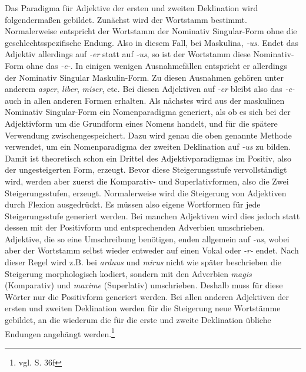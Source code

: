 Das Paradigma für Adjektive der ersten und zweiten Deklination wird folgendermaßen gebildet. Zunächst wird der Wortstamm bestimmt. Normalerweise entspricht der Wortstamm der Nominativ Singular-Form ohne die geschlechtsspezifische Endung. Also in diesem Fall, bei Maskulina, \textit{-us}. Endet das Adjektiv allerdings auf \textit{-er} statt auf \textit{-us}, so ist der Wortstamm diese Nominativ-Form ohne das \textit{-e-}. In einigen wenigen Ausnahmefällen entspricht er allerdings der Nominativ Singular Maskulin-Form. Zu diesen Ausnahmen gehören unter anderem \textit{asper}, \textit{liber}, \textit{miser}, etc. Bei diesen Adjektiven auf \textit{-er} bleibt also das \textit{-e-} auch in allen anderen Formen erhalten. Als nächstes wird aus der maskulinen Nominativ Singular-Form ein Nomenparadigma generiert, als ob es sich bei der Adjektivform um die Grundform eines Nomens handelt, und für die spätere Verwendung zwischengespeichert. Dazu wird genau die oben genannte Methode verwendet, um ein Nomenparadigma der zweiten Deklination auf \textit{-us} zu bilden. Damit ist theoretisch schon ein Drittel des Adjektivparadigmas im Positiv, also der ungesteigerten Form, erzeugt. Bevor diese Steigerungsstufe vervollständigt wird, werden aber zuerst die Komparativ- und Superlativformen, also die Zwei Steigerungsstufen, erzeugt. Normalerweise wird die Steigerung von Adjektiven durch Flexion ausgedrückt. Es müssen also eigene Wortformen für jede Steigerungsstufe generiert werden. Bei manchen Adjektiven wird dies jedoch statt dessen mit der Positivform und entsprechenden Adverbien umschrieben. Adjektive, die so eine Umschreibung benötigen, enden allgemein auf \textit{-us}, wobei aber der Wortstamm selbst wieder entweder auf einen Vokal oder \textit{-r-} endet. Nach dieser Regel wird z.B. bei \textit{arduus} und \textit{mirus} nicht wie später beschrieben die Steigerung morphologisch kodiert, sondern mit den Adverbien \textit{magis} (Komparativ) und \textit{maxime} (Superlativ) umschrieben. Deshalb muss für diese Wörter nur die Positivform generiert werden. Bei allen anderen Adjektiven der ersten und zweiten Deklination werden für die Steigerung neue Wortstämme gebildet, an die wiederum die für die erste und zweite Deklination übliche Endungen angehängt werden.\footnote{vgl. \cite{BAYER-LINDAUER1994} S. 36f} \par
